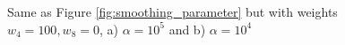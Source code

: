 \documentclass[a4paper,10pt]{article}
\begin{document}
\begin{figure}[h]
	\centering
	\begin{minipage}[h]{0.49\linewidth}
	\end{minipage}
	\hfill
	\begin{minipage}[h]{0.49\linewidth}
	\end{minipage}
	\caption{\label{fig:with_weights} Same as Figure \ref{fig:smoothing_parameter} but with weights $w_4=100, w_8=0$, a) $\alpha=10^5$ and b) $\alpha=10^4$}
\end{figure}
\end{document}

